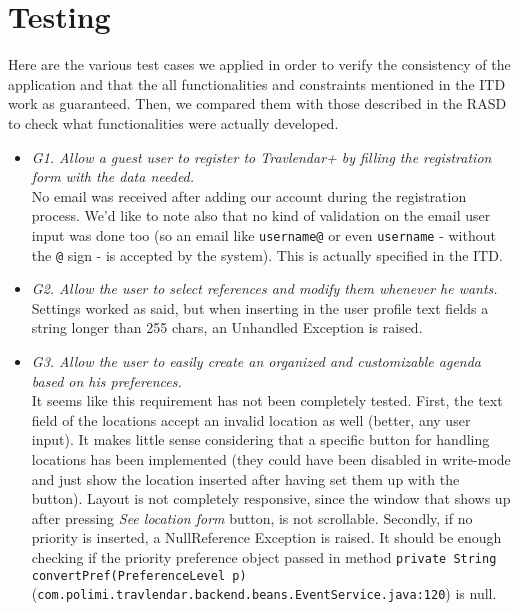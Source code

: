 \chapter{Testing}
\label{cha:testing}

Here are the various test cases we applied in order to verify the consistency of the application and that the all functionalities and constraints mentioned in the ITD work as guaranteed. Then, we compared them with those described in the RASD to check what functionalities were actually developed.

\begin{itemize}
\item \textit{G1. Allow a guest user to register to Travlendar+ by filling the registration form with the data needed.} \\
No email was received after adding our account during the registration process. We'd like to note also that no kind of validation on the email user input was done too (so an email like \texttt{username@} or even \texttt{username} - without the \texttt{@} sign - is accepted by the system). This is actually specified in the ITD.

\item \textit{G2. Allow the user to select references and modify them whenever he wants.} \\
Settings worked as said, but when inserting in the user profile text fields a string longer than 255 chars, an Unhandled Exception is raised.

\item \textit{G3. Allow the user to easily create an organized and customizable agenda based on his preferences.} \\
It seems like this requirement has not been completely tested. First, the text field of the locations accept an invalid location as well (better, any user input). It makes little sense considering that a specific button for handling locations has been implemented (they could have been disabled in write-mode and just show the location inserted after having set them up with the button). Layout is not completely responsive, since the window that shows up after pressing \textit{See location form} button, is not scrollable. Secondly, if no priority is inserted, a NullReference Exception is raised. It should be enough checking if the priority preference object passed in method \texttt{private String convertPref(PreferenceLevel p)} (\texttt{com.polimi.travlendar.backend.beans.EventService.java:120}) is null. 


\end{itemize}
